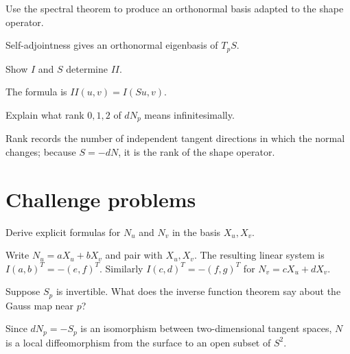 \begin{problem}\label{prob:vii16-10}
Use the spectral theorem to produce an orthonormal basis adapted to the shape operator.
\end{problem}
\begin{solution}
Self-adjointness gives an orthonormal eigenbasis of \(T_pS\).
\end{solution}

\begin{problem}\label{prob:vii16-11}
Show \(I\) and \(S\) determine \(II\).
\end{problem}
\begin{solution}
The formula is \(II(u,v)=I(Su,v)\).
\end{solution}

\begin{problem}\label{prob:vii16-12}
Explain what rank \(0,1,2\) of \(dN_p\) means infinitesimally.
\end{problem}
\begin{solution}
Rank records the number of independent tangent directions in which the normal changes; because \(S=-dN\), it is the rank of the shape operator.
\end{solution}

\section{Challenge problems}
\begin{problem}\label{prob:vii16-ch01}
Derive explicit formulas for \(N_u\) and \(N_v\) in the basis \(X_u,X_v\).
\end{problem}
\begin{solution}
Write \(N_u=aX_u+bX_v\) and pair with \(X_u,X_v\). The resulting linear system is \(I(a,b)^T=-(e,f)^T\). Similarly \(I(c,d)^T=-(f,g)^T\) for \(N_v=cX_u+dX_v\).
\end{solution}

\begin{problem}\label{prob:vii16-ch02}
Suppose \(S_p\) is invertible. What does the inverse function theorem say about the Gauss map near \(p\)?
\end{problem}
\begin{solution}
Since \(dN_p=-S_p\) is an isomorphism between two-dimensional tangent spaces, \(N\) is a local diffeomorphism from the surface to an open subset of \(S^2\).
\end{solution}

